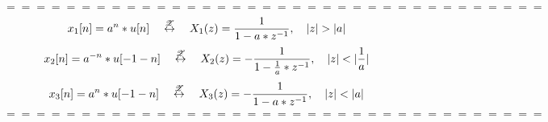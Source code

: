 \begin{Formelsamling}
    \begin{underrubrik}
        \[====================================                                                                                          \]
        \[x_1[n] = a^n*u[n] \quad\overset{\mathscr{Z}}{\leftrightarrow}\quad X_1(z) = \frac{1}{1 - a*z^{-1}}, \quad |z| > |a|                                          \]
        \[x_2[n] = a^{-n}*u[-1-n] \quad\overset{\mathscr{Z}}{\leftrightarrow}\quad X_2(z) = -\frac{1}{1 - \frac{1}{a}*z^{-1}}, \quad |z| < |\frac{1}{a}|               \]
        \[x_3[n] = a^n*u[-1-n] \transformation{Z} X_3(z) = - \frac{1}{1 - a*z^{-1}}, \tab |z|<|a|                                       \]
        \[====================================                                                                                          \]
    \end{underrubrik}
\end{Formelsamling}
